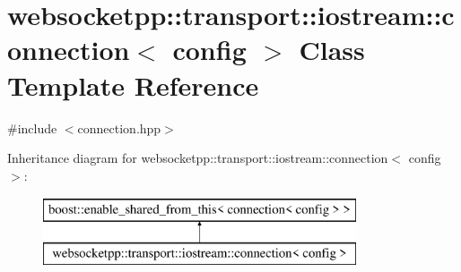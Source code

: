 \hypertarget{classwebsocketpp_1_1transport_1_1iostream_1_1connection}{}\section{websocketpp\+:\+:transport\+:\+:iostream\+:\+:connection$<$ config $>$ Class Template Reference}
\label{classwebsocketpp_1_1transport_1_1iostream_1_1connection}


{\ttfamily \#include $<$connection.\+hpp$>$}

Inheritance diagram for websocketpp\+:\+:transport\+:\+:iostream\+:\+:connection$<$ config $>$\+:\begin{figure}[H]
\begin{center}
\leavevmode
\includegraphics[height=2.000000cm]{classwebsocketpp_1_1transport_1_1iostream_1_1connection}
\end{center}
\end{figure}
